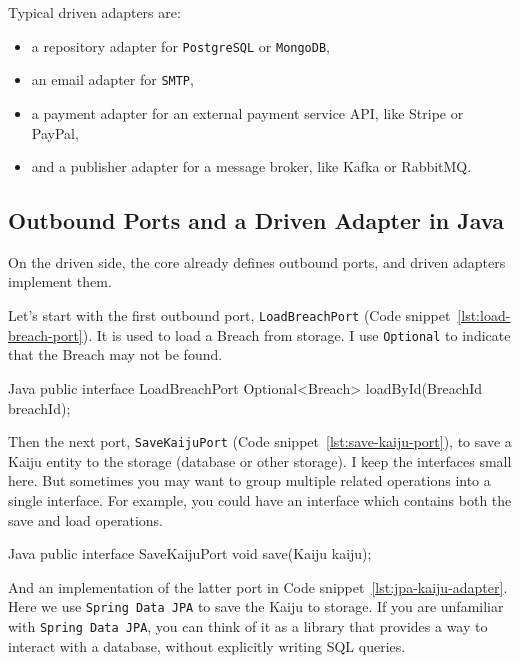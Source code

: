 Typical driven adapters are:
\begin{itemize}
    \item a repository adapter for \texttt{PostgreSQL} or \texttt{MongoDB},
    \item an email adapter for \texttt{SMTP},
    \item a payment adapter for an external payment service API, like Stripe or PayPal,
    \item and a publisher adapter for a message broker, like Kafka or RabbitMQ.
\end{itemize}

\subsection{Outbound Ports and a Driven Adapter in Java}
\label{sec:hexagonal_java_driven_adapter}

On the driven side, the core already defines outbound ports, and driven adapters implement them.

Let's start with the first outbound port, \texttt{LoadBreachPort} (Code snippet~\ref{lst:load-breach-port}). It is used to load a Breach from storage. I use \texttt{Optional}  to indicate that the Breach may not be found.

\begin{ridercode}{Java}
public interface LoadBreachPort
{
    Optional<Breach> loadById(BreachId breachId);
}
\end{ridercode}
\label{lst:load-breach-port}

Then the next port, \texttt{SaveKaijuPort} (Code snippet~\ref{lst:save-kaiju-port}), to save a Kaiju entity to the storage (database or other storage). I keep the interfaces small here. But sometimes you may want to group multiple related operations into a single interface. For example, you could have an interface which contains both the save and load operations. 

\begin{ridercode}{Java}
public interface SaveKaijuPort
{
    void save(Kaiju kaiju);
}
\end{ridercode}
\label{lst:save-kaiju-port}

And an implementation of the latter port in Code snippet~\ref{lst:jpa-kaiju-adapter}. Here we use \texttt{Spring Data JPA} to save the Kaiju to storage. If you are unfamiliar with \texttt{Spring Data JPA}, you can think of it as a library that provides a way to interact with a database, without explicitly writing SQL queries.


